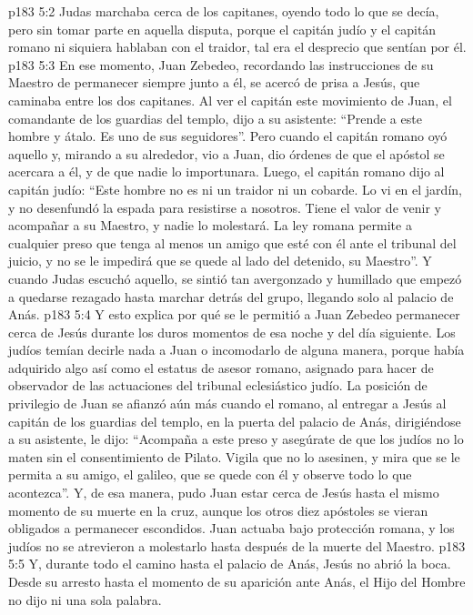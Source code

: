 \vs p183 5:2 Judas marchaba cerca de los capitanes, oyendo todo lo que se decía, pero sin tomar parte en aquella disputa, porque el capitán judío y el capitán romano ni siquiera hablaban con el traidor, tal era el desprecio que sentían por él.
\vs p183 5:3 En ese momento, Juan Zebedeo, recordando las instrucciones de su Maestro de permanecer siempre junto a él, se acercó de prisa a Jesús, que caminaba entre los dos capitanes. Al ver el capitán este movimiento de Juan, el comandante de los guardias del templo, dijo a su asistente: “Prende a este hombre y átalo. Es uno de sus seguidores”. Pero cuando el capitán romano oyó aquello y, mirando a su alrededor, vio a Juan, dio órdenes de que el apóstol se acercara a él, y de que nadie lo importunara. Luego, el capitán romano dijo al capitán judío: “Este hombre no es ni un traidor ni un cobarde. Lo vi en el jardín, y no desenfundó la espada para resistirse a nosotros. Tiene el valor de venir y acompañar a su Maestro, y nadie lo molestará. La ley romana permite a cualquier preso que tenga al menos un amigo que esté con él ante el tribunal del juicio, y no se le impedirá que se quede al lado del detenido, su Maestro”. Y cuando Judas escuchó aquello, se sintió tan avergonzado y humillado que empezó a quedarse rezagado hasta marchar detrás del grupo, llegando solo al palacio de Anás.
\vs p183 5:4 Y esto explica por qué se le permitió a Juan Zebedeo permanecer cerca de Jesús durante los duros momentos de esa noche y del día siguiente. Los judíos temían decirle nada a Juan o incomodarlo de alguna manera, porque había adquirido algo así como el estatus de asesor romano, asignado para hacer de observador de las actuaciones del tribunal eclesiástico judío. La posición de privilegio de Juan se afianzó aún más cuando el romano, al entregar a Jesús al capitán de los guardias del templo, en la puerta del palacio de Anás, dirigiéndose a su asistente, le dijo: “Acompaña a este preso y asegúrate de que los judíos no lo maten sin el consentimiento de Pilato. Vigila que no lo asesinen, y mira que se le permita a su amigo, el galileo, que se quede con él y observe todo lo que acontezca”. Y, de esa manera, pudo Juan estar cerca de Jesús hasta el mismo momento de su muerte en la cruz, aunque los otros diez apóstoles se vieran obligados a permanecer escondidos. Juan actuaba bajo protección romana, y los judíos no se atrevieron a molestarlo hasta después de la muerte del Maestro.
\vs p183 5:5 Y, durante todo el camino hasta el palacio de Anás, Jesús no abrió la boca. Desde su arresto hasta el momento de su aparición ante Anás, el Hijo del Hombre no dijo ni una sola palabra.
